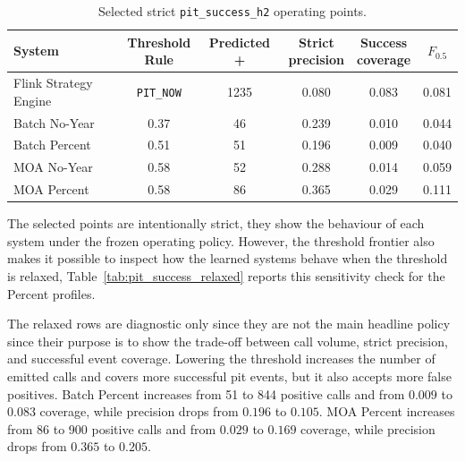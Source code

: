 \begin{table}[htbp]
    \centering
    \caption{Selected strict \texttt{pit\_success\_h2} operating points.}
    \label{tab:pit_success_selected}
    \begin{tabular}{lccccc}
        \toprule
        System                & \shortstack{Threshold                                \\Rule} & Predicted + & \shortstack{Strict\\precision} & \shortstack{Success\\coverage} & $F_{0.5}$ \\
        \midrule
        Flink Strategy Engine & \texttt{PIT\_NOW}     & 1235 & 0.080 & 0.083 & 0.081 \\
        Batch No-Year         & 0.37                  & 46   & 0.239 & 0.010 & 0.044 \\
        Batch Percent         & 0.51                  & 51   & 0.196 & 0.009 & 0.040 \\
        MOA No-Year           & 0.58                  & 52   & 0.288 & 0.014 & 0.059 \\
        MOA Percent           & 0.58                  & 86   & 0.365 & 0.029 & 0.111 \\
        \bottomrule
    \end{tabular}
\end{table}
\FloatBarrier

The selected points are intentionally strict, they show the behaviour of each system under the frozen operating policy. However, the threshold frontier also makes it
possible to inspect how the learned systems behave when the threshold is relaxed, Table~\ref{tab:pit_success_relaxed} reports this sensitivity check for the Percent profiles.

The relaxed rows are diagnostic only since they are not the main headline policy since their purpose is to show the trade-off between call volume, strict precision, and successful
event coverage. Lowering the threshold increases the number of emitted calls and covers more successful pit events, but it also accepts more false positives. Batch
Percent increases from 51 to 844 positive calls and from $0.009$ to $0.083$ coverage, while precision drops from $0.196$ to $0.105$. MOA Percent increases from 86 to
900 positive calls and from $0.029$ to $0.169$ coverage, while precision drops from $0.365$ to $0.205$.

